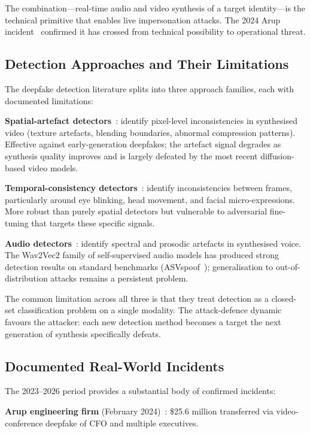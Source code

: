 \documentclass[sigconf,nonacm]{acmart}
\begin{document}
The combination---real-time audio and video synthesis of a target
identity---is the technical primitive that enables live impersonation
attacks. The 2024 Arup incident~\cite{arup2024hk} confirmed it has
crossed from technical possibility to operational threat.

\subsection{Detection Approaches and Their Limitations}

The deepfake detection literature splits into three approach families,
each with documented limitations:

\textbf{Spatial-artefact detectors}~\cite{rossler2019faceforensics,
zhao2024spatial}: identify pixel-level inconsistencies in synthesised
video (texture artefacts, blending boundaries, abnormal compression
patterns). Effective against early-generation deepfakes; the artefact
signal degrades as synthesis quality improves and is largely defeated
by the most recent diffusion-based video models.

\textbf{Temporal-consistency detectors}~\cite{haliassos2024leopard,
gu2024temporal}: identify inconsistencies between frames, particularly
around eye blinking, head movement, and facial micro-expressions.
More robust than purely spatial detectors but vulnerable to
adversarial fine-tuning that targets these specific signals.

\textbf{Audio detectors}~\cite{tak2024aasist,almutairi2023audiosurv}:
identify spectral and prosodic artefacts in synthesised voice. The
Wav2Vec2 family of self-supervised audio models has produced strong
detection results on standard
benchmarks (ASVspoof~\cite{wang2024asvspoof}); generalisation to
out-of-distribution attacks remains a persistent problem.

The common limitation across all three is that they treat detection as
a closed-set classification problem on a single modality. The
attack-defence dynamic favours the attacker: each new detection method
becomes a target the next generation of synthesis specifically defeats.

\subsection{Documented Real-World Incidents}

The 2023--2026 period provides a substantial body of confirmed
incidents:

\textbf{Arup engineering firm} (February 2024)~\cite{arup2024hk}:
\$25.6 million transferred via video-conference deepfake of CFO
and multiple executives.
\end{document}
